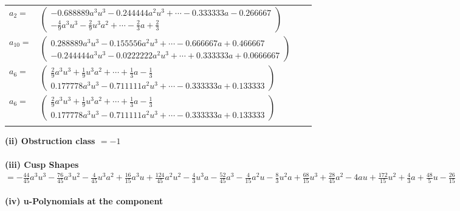 \documentclass[1p]{elsarticle_modified}
\theoremstyle{definition}
\begin{document}
\begin{tabular}{m{7pt} m{180pt} m{7pt} m{180pt} }
\flushright $a_{2}=$&$\begin{pmatrix}-0.688889 a^{3} u^{3}-0.244444 a^{2} u^{3}+\cdots-0.333333 a-0.266667\\-\frac{4}{9} a^3 u^3-\frac{2}{9} u^3 a^2+\cdots-\frac{2}{3} a+\frac{2}{3}\end{pmatrix}$ \\
\flushright $a_{10}=$&$\begin{pmatrix}0.288889 a^{3} u^{3}-0.155556 a^{2} u^{3}+\cdots-0.666667 a+0.466667\\-0.244444 a^{3} u^{3}-0.0222222 a^{2} u^{3}+\cdots+0.333333 a+0.0666667\end{pmatrix}$ \\
\flushright $a_{6}=$&$\begin{pmatrix}\frac{2}{9} a^3 u^3+\frac{1}{9} u^3 a^2+\cdots+\frac{1}{3} a-\frac{1}{3}\\0.177778 a^{3} u^{3}-0.711111 a^{2} u^{3}+\cdots-0.333333 a+0.133333\end{pmatrix}$\\ \flushright $a_{6}=$&$\begin{pmatrix}\frac{2}{9} a^3 u^3+\frac{1}{9} u^3 a^2+\cdots+\frac{1}{3} a-\frac{1}{3}\\0.177778 a^{3} u^{3}-0.711111 a^{2} u^{3}+\cdots-0.333333 a+0.133333\end{pmatrix}$\\&\end{tabular}
\flushleft \textbf{(ii) Obstruction class $= -1$}\\~\\
\flushleft \textbf{(iii) Cusp Shapes $= -\frac{44}{45} a^3 u^3-\frac{76}{45} a^3 u^2-\frac{4}{45} u^3 a^2+\frac{16}{15} a^3 u+\frac{124}{45} a^2 u^2-\frac{4}{3} u^3 a-\frac{52}{45} a^3-\frac{4}{15} a^2 u-\frac{8}{3} u^2 a+\frac{68}{15} u^3+\frac{28}{45} a^2-4 a u+\frac{172}{15} u^2+\frac{4}{3} a+\frac{48}{5} u-\frac{26}{15}$}\\~\\
\newpage\renewcommand{\arraystretch}{1}
\flushleft \textbf{(iv) u-Polynomials at the component}\newline \\
\end{document}
